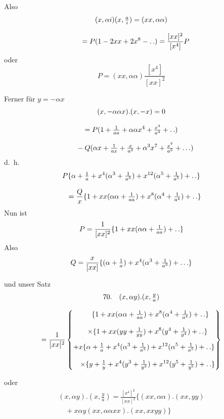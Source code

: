 Also
\[
\begin{gathered}(x,\alpha i)(x,\tfrac ai)=(xx,\alpha\alpha)
 \\[8pt]\quad{}=P(1-2xx+2x^8-\mathinner{.\,.})=\frac{[xx]^2}{[x^4]}P\end{gathered}
\]
oder
\[
P=(xx,\alpha\alpha)\frac{[x^4]}{[xx]^2}
\]

Ferner für $y=-\alpha x$
\[
\begin{gathered}
(x,-\alpha\alpha x).(x,-x)=0\\[8pt]
=P(1+\tfrac1{aa}+\alpha\alpha x^4+\tfrac{x^4}{a^4}+\mathinner{.\,.})
 \\[8pt]\quad{}-Q(\alpha x+\tfrac1{ax}+\tfrac x{a^3}+\alpha^3x^7+\tfrac{x^7}{a^5}+\mathinner{.\,.\,.})
\end{gathered}
\]
d.\ h.
\[
\begin{gathered}
P\{\alpha+\tfrac1a+x^4(\alpha^3+\tfrac1{a^3})+x^{12}(\alpha^5+\tfrac1{a^5})+\mathinner{.\,.}\}\\[8pt]
\quad=\frac Qx\{1+xx(\alpha\alpha+\tfrac1{aa})+x^8(\alpha^4+\tfrac1{a^4})+\mathinner{.\,.}\}
\end{gathered}
\]
Nun ist
\[
P=\frac1{[xx]^2}\{1+xx(\alpha\alpha+\tfrac1{aa})+\mathinner{.\,.}\}
\]
Also
\[
Q=\frac x{[xx]}\{(\alpha+\tfrac1a)+x^4(\alpha^3+\tfrac1{a^3})+\mathinner{.\,.\,.}\}
\]

und unser Satz
\[
\begin{gathered}
70.\quad{}
(x,\alpha y).(x,\tfrac ya)\\[8pt]
=\frac1{[xx]^2}\left\{\begin{gathered}
\phantom{{}+x}\{1+xx(\alpha\alpha+\tfrac1{aa})+x^8(\alpha^4+\tfrac1{a^4})+\mathinner{.\,.}\}\\[8pt]
\quad\times\{1+xx(yy+\tfrac1{yy})+x^8(y^4+\tfrac1{y^4})+\mathinner{.\,.}\}\\[1ex]
+x\{\alpha+\tfrac1a+x^4(\alpha^3+\tfrac1{a^3})+x^{12}(\alpha^5+\tfrac1{a^5})+\mathinner{.\,.}\}\\[8pt]
\quad\times\{y+\tfrac1y+x^4(y^3+\tfrac1{y^3})+x^{12}(y^5+\tfrac1{y^5})+\mathinner{.\,.}\}
\end{gathered}\right\}
\end{gathered}
\]



oder
\[
\begin{gathered}(x,\alpha y).(x,\tfrac ya)
 =\frac{[x^4]^2}{[xx]^2}\{(xx,\alpha\alpha).(xx,yy)
 \\[8pt]\quad{}+x\alpha y(xx,\alpha\alpha xx).(xx,xxyy)\}\end{gathered}
\]

